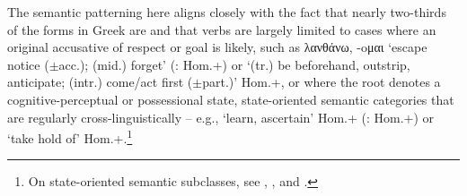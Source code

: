 \documentclass[output=paper,colorlinks,citecolor=brown]{langscibook}
\begin{document}
\begin{exe}
\begin{xlist}
    \end{xlist}
 
\end{exe}


 


The semantic patterning here aligns closely with the fact that nearly two-thirds of the forms in Greek are  and that  verbs are largely limited to cases where an original accusative of respect or goal is likely, such as λανθάνω, \mbox{-oμαι} ‘escape notice ($\pm$acc.); (mid.) forget’ (:  Hom.+) or  ‘(tr.) be beforehand, outstrip, anticipate; (intr.) come/act first ($\pm$part.)’ Hom.+, or where the root denotes a cognitive-perceptual or possessional state, state-oriented semantic categories that are regularly  cross-linguistically -- e.g.,  ‘learn, ascertain’ Hom.+ (:  Hom.+) or   ‘take hold of’ Hom.+.\footnote{On state-oriented semantic subclasses, see \citealt{Rau2013}, \citeyear{Rau2016}, and \citeyear{Rau2017}.}
\end{document}
